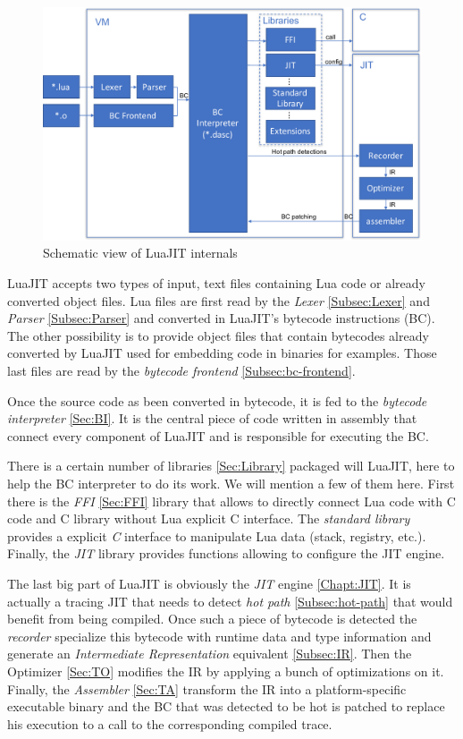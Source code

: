 \begin{figure}[H]
    \centering
	\includegraphics[width=\textwidth]{./Images/LuaJIT.pdf}
    \caption{Schematic view of LuaJIT internals}
    \label{fig:luajit-internal}
\end{figure}{}

LuaJIT accepts two types of input,
text files containing Lua code or already converted object files. Lua files are
first read by the \emph{Lexer} \ref{Subsec:Lexer} and \emph{Parser} \ref{Subsec:Parser} and
converted in LuaJIT's bytecode instructions (BC). The other possibility is to provide
object files that contain bytecodes already converted by LuaJIT used for
embedding code in binaries for examples. Those last files are read by the
\emph{bytecode frontend} \ref{Subsec:bc-frontend}.

Once the source code as been converted in bytecode, it is fed to the \emph{bytecode
interpreter} \ref{Sec:BI}. It is the central piece of code written in assembly
that connect every component of LuaJIT and is responsible for executing the BC.

There is a certain number of libraries \ref{Sec:Library} packaged will LuaJIT, here
to help the BC interpreter to do its work. We will mention a few of them here.
First there is the \emph{FFI} \ref{Sec:FFI} library that allows to directly connect Lua
code with C code and C library without Lua explicit C interface. The \emph{standard
library} provides a explicit \emph{C} interface to manipulate Lua data
(stack, registry, etc.). Finally, the \emph{JIT} library provides functions
allowing to configure the JIT engine.

The last big part of LuaJIT is obviously the \emph{JIT} engine \ref{Chapt:JIT}.
It is actually a tracing JIT that needs to detect \emph{hot path}
\ref{Subsec:hot-path} that would benefit from being compiled. Once such a piece
of bytecode is detected the \emph{recorder} specialize this bytecode with runtime
data and type information and generate an \emph{Intermediate Representation}
equivalent \ref{Subsec:IR}. Then the Optimizer \ref{Sec:TO} modifies the IR by
applying a bunch of optimizations on it. Finally, the \emph{Assembler} \ref{Sec:TA}
transform the IR into a platform-specific executable binary and the BC that was
detected to be hot is patched to replace his execution to a call to the
corresponding compiled trace.
